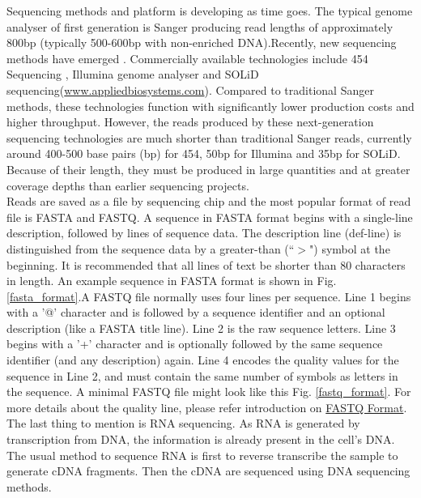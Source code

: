 \documentclass{article}
\begin{document}
\noindent Sequencing methods and platform is developing as time goes. The typical genome analyser of first generation is Sanger\cite{sanger1977nucleotide} producing read lengths of approximately 800bp (typically 500-600bp with non-enriched DNA).Recently, new sequencing methods have emerged \cite{mardis2008impact}. Commercially available technologies include 454 Sequencing \cite{margulies2005genome}, Illumina genome analyser \cite{bentley2006whole} and SOLiD sequencing(\href{www.appliedbiosystems.com}{www.appliedbiosystems.com}). Compared to traditional Sanger methods, these technologies function with significantly lower production costs and higher throughput. However, the reads produced by these next-generation sequencing technologies are much shorter than traditional Sanger reads, currently around 400-500 base pairs (bp) for 454, 50bp for Illumina and 35bp for SOLiD. Because of their length, they must be produced in large quantities and at greater coverage depths than earlier sequencing projects.\\
Reads are saved as a file by sequencing chip and the most popular format of read file is FASTA and FASTQ. A sequence in FASTA format begins with a single-line description, followed by lines of sequence data. The description line (def-line) is distinguished from the sequence data by a greater-than (``$>$") symbol at the beginning. It is recommended that all lines of text be shorter than 80 characters in length. An example sequence in FASTA format is shown in Fig. \ref{fasta_format}.A FASTQ file normally uses four lines per sequence. Line 1 begins with a '@' character and is followed by a sequence identifier and an optional description (like a FASTA title line). Line 2 is the raw sequence letters. Line 3 begins with a '+' character and is optionally followed by the same sequence identifier (and any description) again. Line 4 encodes the quality values for the sequence in Line 2, and must contain the same number of symbols as letters in the sequence. A minimal FASTQ file might look like this Fig. \ref{fastq_format}. For more details about the quality line, please refer introduction on \href{http://en.wikipedia.org/wiki/FASTQ_format}{FASTQ Format}.\\
The last thing to mention is RNA sequencing. As RNA is generated by transcription from DNA, the information is already present in the cell's DNA. The usual method to sequence RNA is first to reverse transcribe the sample to generate cDNA fragments. Then the cDNA are sequenced using DNA sequencing methods.\\
\end{document}
